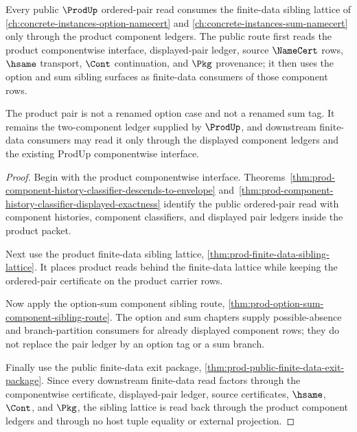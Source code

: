 \begin{theorem}
\label{thm:prod-option-sum-sibling-lattice-readback}
Every public $\ProdUp$ ordered-pair read consumes the finite-data sibling lattice of \autoref{ch:concrete-instances-option-namecert} and \autoref{ch:concrete-instances-sum-namecert} only through the product component ledgers. The public route first reads the product componentwise interface, displayed-pair ledger, source $\NameCert$ rows, $\hsame$ transport, $\Cont$ continuation, and $\Pkg$ provenance; it then uses the option and sum sibling surfaces as finite-data consumers of those component rows.

The product pair is not a renamed option case and not a renamed sum tag. It remains the two-component ledger supplied by $\ProdUp$, and downstream finite-data consumers may read it only through the displayed component ledgers and the existing ProdUp componentwise interface.
\end{theorem}
\begin{proof}
Begin with the product componentwise interface. Theorems~\ref{thm:prod-component-history-classifier-descends-to-envelope} and~\ref{thm:prod-component-history-classifier-displayed-exactness} identify the public ordered-pair read with component histories, component classifiers, and displayed pair ledgers inside the product packet.

Next use the product finite-data sibling lattice, \autoref{thm:prod-finite-data-sibling-lattice}. It places product reads behind the finite-data lattice while keeping the ordered-pair certificate on the product carrier rows.

Now apply the option-sum component sibling route, \autoref{thm:prod-option-sum-component-sibling-route}. The option and sum chapters supply possible-absence and branch-partition consumers for already displayed component rows; they do not replace the pair ledger by an option tag or a sum branch.

Finally use the public finite-data exit package, \autoref{thm:prod-public-finite-data-exit-package}. Since every downstream finite-data read factors through the componentwise certificate, displayed-pair ledger, source certificates, $\hsame$, $\Cont$, and $\Pkg$, the sibling lattice is read back through the product component ledgers and through no host tuple equality or external projection.
\end{proof}

